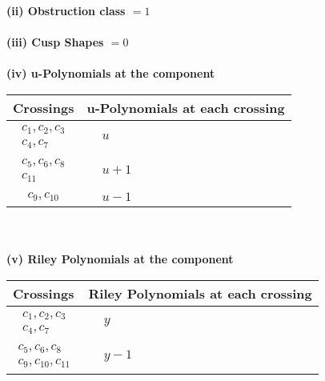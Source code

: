 \documentclass[1p]{elsarticle_modified}
\theoremstyle{definition}
\begin{document}
\flushleft \textbf{(ii) Obstruction class $= 1$}\\~\\
\flushleft \textbf{(iii) Cusp Shapes $= 0$}\\~\\
\newpage\renewcommand{\arraystretch}{1}
\flushleft \textbf{(iv) u-Polynomials at the component}\newline \\
\begin{tabular}{m{50pt}|m{274pt}}
Crossings & \hspace{64pt}u-Polynomials at each crossing \\
\hline $$\begin{aligned}c_{1},c_{2},c_{3}\\c_{4},c_{7}\end{aligned}$$&$\begin{aligned}
&u
\end{aligned}$\\
\hline $$\begin{aligned}c_{5},c_{6},c_{8}\\c_{11}\end{aligned}$$&$\begin{aligned}
&u+1
\end{aligned}$\\
\hline $$\begin{aligned}c_{9},c_{10}\end{aligned}$$&$\begin{aligned}
&u-1
\end{aligned}$\\
\hline
\end{tabular}\\~\\
\newpage\renewcommand{\arraystretch}{1}
\flushleft \textbf{(v) Riley Polynomials at the component}\newline \\
\begin{tabular}{m{50pt}|m{274pt}}
Crossings & \hspace{64pt}Riley Polynomials at each crossing \\
\hline $$\begin{aligned}c_{1},c_{2},c_{3}\\c_{4},c_{7}\end{aligned}$$&$\begin{aligned}
&y
\end{aligned}$\\
\hline $$\begin{aligned}c_{5},c_{6},c_{8}\\c_{9},c_{10},c_{11}\end{aligned}$$&$\begin{aligned}
&y-1
\end{aligned}$\\
\hline
\end{tabular}\\~\\
\end{document}
